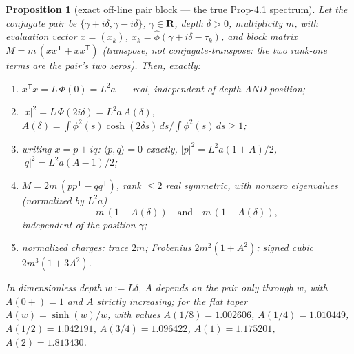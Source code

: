 \documentclass[11pt]{article}
\theoremstyle{plain}
\newtheorem{proposition}[theorem]{Proposition}
\theoremstyle{definition}
\theoremstyle{remark}
\newcommand{\R}{\mathbf{R}}
\newcommand{\ph}{\widehat{\phi}}
\begin{document}
\begin{proposition}[exact off-line pair block --- the true Prop-4.1 spectrum]
\label{prop:pairblock}
Let the conjugate pair be $\{\gamma + i\delta, \gamma - i\delta\}$,
$\gamma \in \R$, depth $\delta > 0$, multiplicity $m$, with evaluation vector
$x = (x_k)$, $x_k = \ph(\gamma + i\delta - \tau_k)$, and block matrix
$M = m\,(x x^{\mathsf{T}} + \bar{x}\bar{x}^{\mathsf{T}})$ (transpose, not
conjugate-transpose: the two rank-one terms are the pair's two zeros). Then,
exactly:
\begin{enumerate}
\item[(i)] $x^{\mathsf{T}} x = L\,\Phi(0) = L^2 a$ --- real, independent of depth
  AND position;
\item[(ii)] $|x|^2 = L\,\Phi(2 i \delta) = L^2 a\, A(\delta)$,
  $A(\delta) = \int \phi^2(s) \cosh(2\delta s)\, ds
   \big/ \int \phi^2(s)\, ds \ge 1$;
\item[(iii)] writing $x = p + i q$: $\langle p, q \rangle = 0$ exactly,
  $|p|^2 = L^2 a (1 + A)/2$, $|q|^2 = L^2 a (A - 1)/2$;
\item[(iv)] $M = 2m\,(p p^{\mathsf{T}} - q q^{\mathsf{T}})$, rank $\le 2$ real
  symmetric, with nonzero eigenvalues (normalized by $L^2 a$)
  \[
    m\,(1 + A(\delta)) \quad\text{and}\quad m\,(1 - A(\delta)),
  \]
  independent of the position $\gamma$;
\item[(v)] normalized charges: trace $2m$; Frobenius $2m^2(1 + A^2)$; signed
  cubic $2m^3(1 + 3A^2)$.
\end{enumerate}
In dimensionless depth $w := L\delta$, $A$ depends on the pair only through $w$,
with $A(0+) = 1$ and $A$ strictly increasing; for the flat taper
$A(w) = \sinh(w)/w$, with values $A(1/8) = 1.002606$, $A(1/4) = 1.010449$,
$A(1/2) = 1.042191$, $A(3/4) = 1.096422$, $A(1) = 1.175201$, $A(2) = 1.813430$.
\end{proposition}
\end{document}
